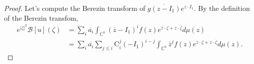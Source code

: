 \documentclass[11pt,reqno]{amsart}
\theoremstyle{definition}
\begin{document}
\begin{proof}
Let's compute the Berezin transform of $\overline{g(z-I_1)}e^{z\cdot I_1}$. By the definition of the Berezin transfom,
\begin{align*}
e^{|\zeta|^2}\mathcal{B}[u](\zeta)&=\sum_i \overline{a_i}\int_{\mathbb{C}^n} (\overline{z}-I_1)^i f(z) e^{\overline{z}\cdot \zeta+z\cdot \overline{\zeta}}d\mu(z)\\
&=\sum_i \overline{a_i} \sum_{j\leq i}\mathrm{C}_{i}^j(-I_1)^{i-j}
\int_{\mathbb{C}^n} \overline{z}^j f(z) e^{\overline{z}\cdot \zeta+z\cdot \overline{\zeta}}d\mu(z).

\end{align*}
\end{proof}
\end{document}
